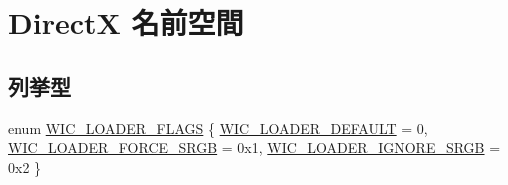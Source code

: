 \hypertarget{namespace_direct_x}{}\section{DirectX 名前空間}
\label{namespace_direct_x}
\subsection*{列挙型}
\begin{DoxyCompactItemize}
\item 
enum \mbox{\hyperlink{namespace_direct_x_ad1ef6b84995b08da5a29130bd8cc5c2a}{W\+I\+C\+\_\+\+L\+O\+A\+D\+E\+R\+\_\+\+F\+L\+A\+GS}} \{ \mbox{\hyperlink{namespace_direct_x_ad1ef6b84995b08da5a29130bd8cc5c2aa31db232209a0c414f3c5dd3f36fad240}{W\+I\+C\+\_\+\+L\+O\+A\+D\+E\+R\+\_\+\+D\+E\+F\+A\+U\+LT}} = 0, 
\mbox{\hyperlink{namespace_direct_x_ad1ef6b84995b08da5a29130bd8cc5c2aa19253126a33109ad1e9ca15710a48a71}{W\+I\+C\+\_\+\+L\+O\+A\+D\+E\+R\+\_\+\+F\+O\+R\+C\+E\+\_\+\+S\+R\+GB}} = 0x1, 
\mbox{\hyperlink{namespace_direct_x_ad1ef6b84995b08da5a29130bd8cc5c2aaa411d70404895e65f12c2e6f4216636c}{W\+I\+C\+\_\+\+L\+O\+A\+D\+E\+R\+\_\+\+I\+G\+N\+O\+R\+E\+\_\+\+S\+R\+GB}} = 0x2
 \}
\end{DoxyCompactItemize}
